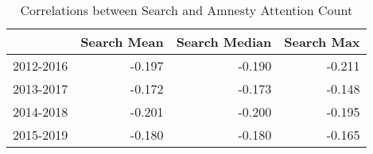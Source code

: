 \begin{table}[ht]
\centering
\begin{tabular}{|l|rrr|}
  \hline
 & Search Mean & Search Median & Search Max \\ 
  \hline
2012-2016 & -0.197 & -0.190 & -0.211 \\ 
  2013-2017 & -0.172 & -0.173 & -0.148 \\ 
  2014-2018 & -0.201 & -0.200 & -0.195 \\ 
  2015-2019 & -0.180 & -0.180 & -0.165 \\ 
   \hline
\end{tabular}
\caption{Correlations between Search and Amnesty Attention Count} 
\end{table}
